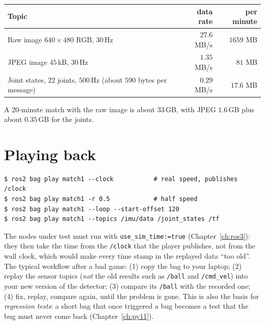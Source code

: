 \begin{center}
\renewcommand{\arraystretch}{1.25}
\begin{tabular}{p{5.2cm}rr}
\textbf{Topic} & \textbf{data rate} & \textbf{per minute}\\ \hline
Raw image $640\times480$ RGB, $30$\,Hz & $27.6$ MB/s & $1659$ MB\\
JPEG image $45$\,kB, $30$\,Hz & $1.35$ MB/s & $81$ MB\\
Joint states, $22$ joints, $500$\,Hz (about $590$ bytes per message) & $0.29$ MB/s & $17.6$ MB\\
\end{tabular}
\end{center}
A $20$-minute match with the raw image is about $33$\,GB, with JPEG $1.6$\,GB plus about $0.35$\,GB for the joints.

\section*{Playing back}
\begin{verbatim}
$ ros2 bag play match1 --clock           # real speed, publishes /clock
$ ros2 bag play match1 -r 0.5            # half speed
$ ros2 bag play match1 --loop --start-offset 120
$ ros2 bag play match1 --topics /imu/data /joint_states /tf
\end{verbatim}
The nodes under test must run with \verb!use_sim_time:=true! (Chapter~\ref{ch:ros3}): they then take the time from the \verb!/clock! that the player publishes, not from the wall clock, which would make every time stamp in the replayed data ``too old''. The typical workflow after a bad game: (1) copy the bag to your laptop; (2) replay the sensor topics (\emph{not} the old results such as \verb!/ball! and \verb!/cmd_vel!) into your new version of the detector; (3) compare its \verb!/ball! with the recorded one; (4) fix, replay, compare again, until the problem is gone. This is also the basis for \emph{regression tests}: a short bag that once triggered a bug becomes a test that the bug must never come back (Chapter~\ref{ch:py11}).

